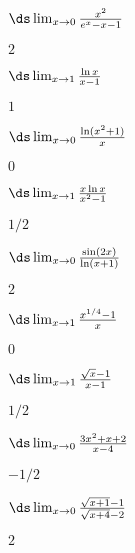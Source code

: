 \begin{multicols}{2}[]
\begin{enumialphparenastyle}
\begin{ex} 
 $\ds\lim_{x\to0}{x^2\over e^x-x-1}$
\begin{sol}
 $2$
\end{sol}
\end{ex}

\begin{ex} 
 $\ds\lim_{x\to1}{\ln x\over x-1}$
\begin{sol}
 $1$
\end{sol}
\end{ex}

\begin{ex} 
 $\ds\lim_{x\to0}{\ln(x^2+1)\over x}$
\begin{sol}
 $0$
\end{sol}
\end{ex}

\begin{ex} 
 $\ds\lim_{x\to1}{x\ln x\over x^2-1}$
\begin{sol}
 $1/2$
\end{sol}
\end{ex}

\begin{ex} 
 $\ds\lim_{x\to0}{\sin(2x)\over\ln(x+1)}$
\begin{sol}
 $2$
\end{sol}
\end{ex}

\begin{ex} 
 $\ds\lim_{x\to1}{x^{1/4}-1\over x}$
\begin{sol}
 $0$
\end{sol}
\end{ex}

\begin{ex} 
 $\ds\lim_{x\to1}{\sqrt{x}-1\over x-1}$
\begin{sol}
 $1/2$
\end{sol}
\end{ex}

\begin{ex} 
 $\ds\lim_{x\to0}{3x^2+x+2\over x-4}$
\begin{sol}
 $-1/2$
\end{sol}
\end{ex}

\begin{ex} 
 $\ds\lim_{x\to0}{\sqrt{x+1}-1\over \sqrt{x+4}-2}$
\begin{sol}
 $2$
\end{sol}
\end{ex}


\end{enumialphparenastyle}
\end{multicols}
